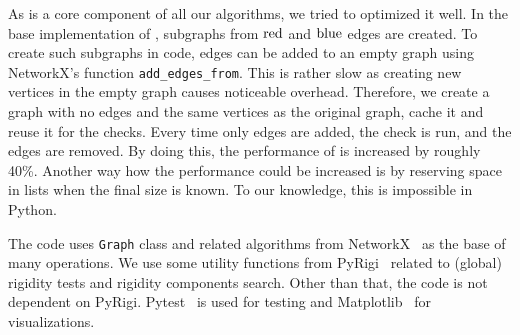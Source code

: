 As \IsNACColoring{} is a core component of all our algorithms,
we tried to optimized it well.
%
In the base implementation of \IsNACColoring{},
subgraphs from \( \text{red} \) and \( \text{blue} \) edges are created.
To create such subgraphs in code, edges can be added to an empty graph
using NetworkX's function \texttt{add\_edges\_from}.
%
This is rather slow as creating new vertices in the empty graph causes noticeable overhead.
Therefore, we create a graph with no edges and the same vertices as the original graph,
cache it and reuse it for the checks.
Every time only edges are added, the check is run, and the edges are removed.
By doing this, the performance of \IsNACColoring{} is increased by roughly 40\%.
%
Another way how the performance could be increased is by reserving space in lists
when the final size is known.
To our knowledge, this is impossible in Python.

The code uses \texttt{Graph} class and related algorithms from NetworkX~\cite{networkx}
as the base of many operations. We use some utility functions from PyRigi~\cite{pyrigi}
related to (global) rigidity tests and rigidity components search.
Other than that, the code is not dependent on PyRigi.
%
Pytest~\cite{pytest} is used for testing and
Matplotlib~\cite{matplotlib} for visualizations.

